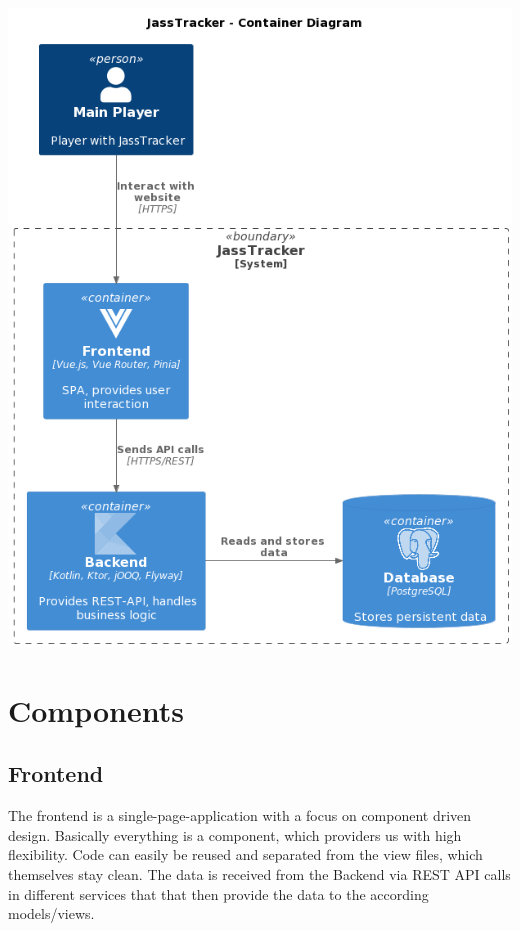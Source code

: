 \includegraphics[width=\textwidth]{resources/diagrams/c4-2-container}

\section{Components}

\subsection{Frontend}
The frontend is a single-page-application with a focus on component driven design.
Basically everything is a component, which providers us with high flexibility.
Code can easily be reused and separated from the view files, which themselves stay clean.
The data is received from the Backend via REST API calls in different services that that then provide the data to the according models/views.

